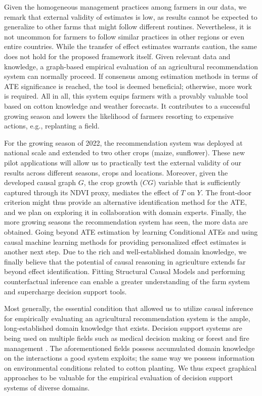 \documentclass[letterpaper]{article} %
\begin{document}
Given the homogeneous management practices among farmers in our data, we remark that external validity of estimates is low, as results cannot be expected to generalize to other farms that might follow different routines. Nevertheless, it is not uncommon for farmers to follow similar practices in other regions or even entire countries. While the transfer of effect estimates warrants caution, the same does not hold for the proposed framework itself. Given relevant data and knowledge, a graph-based empirical evaluation of an agricultural recommendation system can normally proceed. If consensus among estimation methods in terms of ATE significance is reached, the tool is deemed beneficial; otherwise, more work is required.
All in all, this system equips farmers with a provably valuable tool based on cotton knowledge and weather forecasts. It contributes to a successful growing season and lowers the likelihood of farmers resorting to expensive actions, e.g., replanting a field.

For the growing season of 2022, the recommendation system was deployed at national scale and extended to two other crops (maize, sunflower).
These new pilot applications will allow us to practically test the external validity of our results across different seasons, crops and locations. Moreover, given the developed causal graph $G$, the crop growth ($CG$) variable that is sufficiently captured through its NDVI proxy, mediates the effect of $T$ on $Y$. The front-door criterion \cite{pearl2009causality} might thus provide an alternative identification method for the ATE, and we plan on exploring it in collaboration with domain experts. Finally, the more growing seasons the recommendation system has seen, the more data are obtained. Going beyond ATE estimation by learning Conditional ATEs and using causal machine learning methods for providing personalized effect estimates is another next step. Due to the rich and well-established domain knowledge, we finally believe that the potential of causal reasoning in agriculture extends far beyond effect identification. Fitting Structural Causal Models and performing counterfactual inference can enable a greater understanding of the farm system and supercharge decision support tools.

Most generally, the essential condition that allowed us to utilize causal inference for empirically evaluating an agricultural recommendation system is the ample, long-established domain knowledge that exists. Decision support systems are being used on multiple fields \cite{marakas2003decision} such as medical decision making \cite{sutton2020overview} or forest and fire management \cite{segura2014decision, martell2015review}. The aforementioned fields possess accumulated domain knowledge on the interactions a good system exploits; the same way we possess information on environmental conditions related to cotton planting. We thus expect graphical approaches to be valuable for the empirical evaluation of decision support systems of diverse domains.
\end{document}
